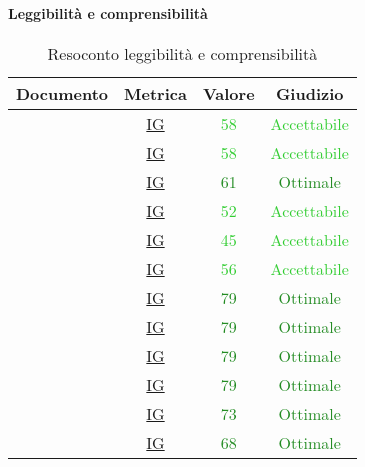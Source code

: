 					\paragraph{Leggibilità e comprensibilità}
						\begin{table}[H]
							\centering
							\small
							\begin{tabular}{c | c | c | c}
								\hline
								\textbf{Documento} & \textbf{Metrica}    & \textbf{Valore} & \textbf{Giudizio} \\ \hline
								      \pdpvuno        & \hyperref[MLEC]{IG} &  \textcolor{LimeGreen}{58}              & \textcolor{LimeGreen}{Accettabile} \\
								      \pdqvuno        & \hyperref[MLEC]{IG} &  \textcolor{LimeGreen}{58}               &  \textcolor{LimeGreen}{Accettabile} \\
								      \ndpvuno        & \hyperref[MLEC]{IG} &  \textcolor{ForestGreen}{61}               & \textcolor{ForestGreen}{Ottimale}\\
								      \sdfv        & \hyperref[MLEC]{IG} &  \textcolor{LimeGreen}{52}               &  \textcolor{LimeGreen}{Accettabile}\\
								      \adrvuno        & \hyperref[MLEC]{IG} &  \textcolor{LimeGreen}{45}               &  \textcolor{LimeGreen}{Accettabile}\\
								       \glvuno        & \hyperref[MLEC]{IG} &  \textcolor{LimeGreen}{56}               & \textcolor{LimeGreen}{Accettabile} \\
								      \vunoi       & \hyperref[MLEC]{IG} &  \textcolor{ForestGreen}{79}               & \textcolor{ForestGreen}{Ottimale}\\
								      \vduei       & \hyperref[MLEC]{IG} &  \textcolor{ForestGreen}{79}               & \textcolor{ForestGreen}{Ottimale}\\
								      \vtrei       & \hyperref[MLEC]{IG} &  \textcolor{ForestGreen}{79}               & \textcolor{ForestGreen}{Ottimale}\\
								    \vquattroi     & \hyperref[MLEC]{IG} &  \textcolor{ForestGreen}{79}               & \textcolor{ForestGreen}{Ottimale}\\
								      \vunoe       & \hyperref[MLEC]{IG} &   \textcolor{ForestGreen}{73}              & \textcolor{ForestGreen}{Ottimale}\\
								      \vduee       & \hyperref[MLEC]{IG} &   \textcolor{ForestGreen}{68}              & \textcolor{ForestGreen}{Ottimale}\\ \hline
							\end{tabular}
							\caption{Resoconto leggibilità e comprensibilità}
							\label{tab_resoconto_leggibilità_e_comprensibilità}
						\end{table}
					
